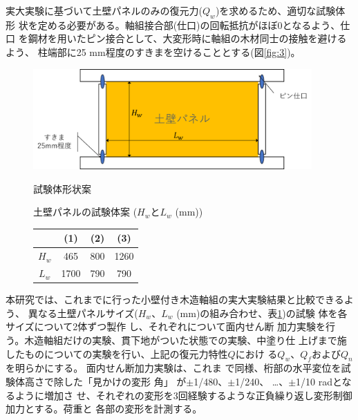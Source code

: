 \documentclass[11pt,a4paper,uplatex,dvipdfmx]{ujarticle} 		%
\makeatletter
\newcommand{\研究課題名}{伝統的な木造土塗り壁の復元力に及ぼす軸組の影響に関する実験研究}
\newcommand{\研究機関名}{公立鳥取環境大学}
\newcommand{\研究代表者氏名}{中治弘行}
\newcommand{\私}{{\研究代表者氏名}}
\newcommand{\研究期間の最終元号年度}{8}  %
\newcommand{\figcaption}[1]{\def\@captype{figure}\caption{#1}}
\newcommand{\tblcaption}[1]{\def\@captype{table}\caption{#1}}
\makeatother
\begin{document}
実大実験に基づいて土壁パネルのみの復元力($Q_w$)を求めるため、適切な試験体形
状を定める必要がある。軸組接合部(仕口)の回転抵抗がほぼ0となるよう、仕口
を鋼材を用いたピン接合として、大変形時に軸組の木材同士の接触を避けるよう、
柱端部に25 mm程度のすきまを空けることとする(図\ref{fig:3})。

\begin{figure}[htb]
  \begin{minipage}{0.6\textwidth}
    \centering\includegraphics[width=0.95\textwidth]{fig3}
    \figcaption{試験体形状案}
    \label{fig:3}
  \end{minipage}
  \quad
  \begin{minipage}{0.35\textwidth}
    \centering
    \vspace{-1cm}
    \tblcaption{土壁パネルの試験体案 ($H_w$と$L_w$ (mm))}
    \label{tab:1}
    \begin{tabular}[htb]{|c|c|c|c|}
      \hline
      & (1) & (2) & (3)  \\\hline
      $H_w$ &  465 & 800 & 1260 \\\hline
      $L_w$ &  1700 & 790 & 790 \\\hline
    \end{tabular} 
  \end{minipage}
\end{figure}

本研究では、これまでに行った小壁付き木造軸組の実大実験結果と比較できるよう、
異なる土壁パネルサイズ($H_w$、$L_w$ (mm)の組み合わせ、表\ref{tab:1})の試験
体を各サイズについて2体ずつ製作%
し、それぞれについて面内せん断
加力実験を行う。木造軸組だけの実験、貫下地がついた状態での実験、中塗り仕
上げまで施したものについての実験を行い、上記の復元力特性$Q$におけ
る$Q_w$、$Q_f$および$Q_n$を明らかにする。
面内せん断加力実験は、これま
で\cite{kakenhi2019}同様、桁部の水平変位を試験体高さで除した「見かけの変形
角」
が$\pm$1/480、$\pm$1/240、%
…、$\pm$1/10 radとなるように増加さ
せ、それぞれの変形を3回経験するような正負繰り返し変形制御加力とする。荷重と
各部の変形を計測する。
\end{document}
